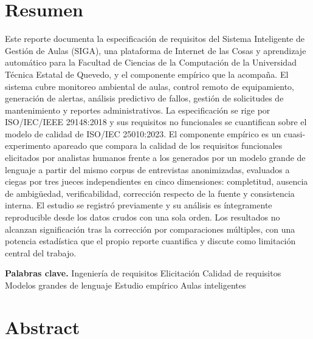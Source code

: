 \documentclass[11pt,a4paper]{article}
\begin{document}
\section*{Resumen}

Este reporte documenta la especificaci\'on de requisitos del Sistema Inteligente de
Gesti\'on de Aulas (SIGA), una plataforma de Internet de las Cosas y aprendizaje
autom\'atico para la Facultad de Ciencias de la Computaci\'on de la Universidad
T\'ecnica Estatal de Quevedo, y el componente emp\'irico que la acompa\~na. El sistema
cubre monitoreo ambiental de aulas, control remoto de equipamiento, generaci\'on de
alertas, an\'alisis predictivo de fallos, gesti\'on de solicitudes de mantenimiento y
reportes administrativos. La especificaci\'on se rige por ISO/IEC/IEEE 29148:2018 y sus
requisitos no funcionales se cuantifican sobre el modelo de calidad de ISO/IEC
25010:2023. El componente emp\'irico es un cuasi-experimento apareado que compara la
calidad de los requisitos funcionales elicitados por analistas humanos frente a los
generados por un modelo grande de lenguaje a partir del mismo corpus de entrevistas
anonimizadas, evaluados a ciegas por tres jueces independientes en cinco dimensiones:
completitud, ausencia de ambig\"uedad, verificabilidad, correcci\'on respecto de la
fuente y consistencia interna. El estudio se registr\'o previamente y su an\'alisis es
\'integramente reproducible desde los datos crudos con una sola orden. Los resultados
no alcanzan significaci\'on tras la correcci\'on por comparaciones m\'ultiples, con una
potencia estad\'istica que el propio reporte cuantifica y discute como limitaci\'on
central del trabajo.

\textbf{Palabras clave.} Ingenier\'ia de requisitos \textbullet{} Elicitaci\'on
\textbullet{} Calidad de requisitos \textbullet{} Modelos grandes de lenguaje
\textbullet{} Estudio emp\'irico \textbullet{} Aulas inteligentes

\vspace{5mm}
\section*{Abstract}
\end{document}
